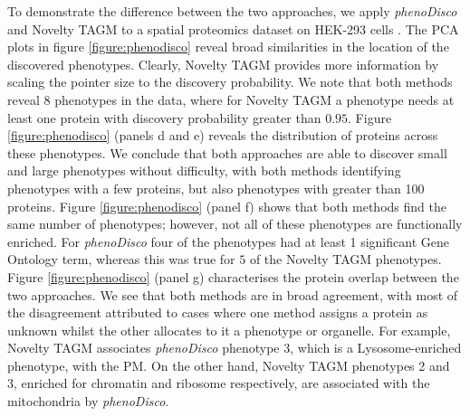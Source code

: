 \documentclass[12pt,english]{article}
\begin{document}
To demonstrate the difference between the two approaches, we apply \textit{phenoDisco} and Novelty TAGM to a spatial proteomics dataset on HEK-293 cells \citep{Breckels:2013}. The PCA plots in figure \ref{figure:phenodisco} reveal broad similarities in the location of the discovered phenotypes. Clearly, Novelty TAGM provides more information by scaling the pointer size to the discovery probability. We note that both methods reveal 8 phenotypes in the data, where for Novelty TAGM a phenotype needs at least one protein with discovery probability greater than $0.95$. Figure \ref{figure:phenodisco} (panels d and e) reveals the distribution of proteins across these phenotypes. We conclude that both approaches are able to discover small and large phenotypes without difficulty, with both methods identifying phenotypes with a few proteins, but also phenotypes with greater than 100 proteins. Figure \ref{figure:phenodisco} (panel f) shows that both methods find the same number of phenotypes; however, not all of these phenotypes are functionally enriched. For \textit{phenoDisco} four of the phenotypes had at least 1 significant Gene Ontology term, whereas this was true for $5$ of the Novelty TAGM phenotypes. Figure \ref{figure:phenodisco} (panel g) characterises the protein overlap between the two approaches. We see that both methods are in broad agreement, with most of the disagreement attributed to cases where one method assigns a protein as unknown whilst the other allocates to it a phenotype or organelle. For example, Novelty TAGM associates \textit{phenoDisco} phenotype 3, which is a Lysosome-enriched phenotype, with the PM. On the other hand, Novelty TAGM phenotypes 2 and 3, enriched for chromatin and ribosome respectively, are associated with the mitochondria by \textit{phenoDisco}.
\end{document}
